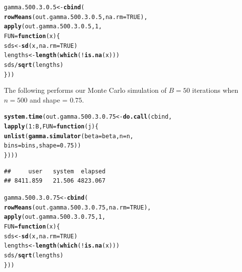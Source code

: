 \documentclass[11pt]{article}\usepackage[]{graphicx}\usepackage[]{color}
\makeatletter
\newcommand{\hlnum}[1]{\textcolor[rgb]{0.686,0.059,0.569}{#1}}%
\newcommand{\hlopt}[1]{\textcolor[rgb]{0,0,0}{#1}}%
\newcommand{\hlstd}[1]{\textcolor[rgb]{0.345,0.345,0.345}{#1}}%
\newcommand{\hlkwa}[1]{\textcolor[rgb]{0.161,0.373,0.58}{\textbf{#1}}}%
\newcommand{\hlkwb}[1]{\textcolor[rgb]{0.69,0.353,0.396}{#1}}%
\newcommand{\hlkwc}[1]{\textcolor[rgb]{0.333,0.667,0.333}{#1}}%
\newcommand{\hlkwd}[1]{\textcolor[rgb]{0.737,0.353,0.396}{\textbf{#1}}}%
\newenvironment{kframe}{%
 \def\at@end@of@kframe{}%
 \ifinner\ifhmode%
  \def\at@end@of@kframe{\end{minipage}}%
  \begin{minipage}{\columnwidth}%
 \fi\fi%
 \def\FrameCommand##1{\hskip\@totalleftmargin \hskip-\fboxsep
 \colorbox{shadecolor}{##1}\hskip-\fboxsep
     \hskip-\linewidth \hskip-\@totalleftmargin \hskip\columnwidth}%
 \MakeFramed {\advance\hsize-\width
   \@totalleftmargin\z@ \linewidth\hsize
   \@setminipage}}%
 {\par\unskip\endMakeFramed%
 \at@end@of@kframe}
\newenvironment{knitrout}{}{} %
\makeatother
\begin{document}
\begin{knitrout}
\color{fgcolor}\begin{kframe}
\begin{alltt}
\hlstd{gamma.500.3.0.5} \hlkwb{<-} \hlkwd{cbind}\hlstd{(}
  \hlkwd{rowMeans}\hlstd{(out.gamma.500.3.0.5,} \hlkwc{na.rm} \hlstd{=} \hlnum{TRUE}\hlstd{),}
  \hlkwd{apply}\hlstd{(out.gamma.500.3.0.5,} \hlnum{1}\hlstd{,}
  \hlkwc{FUN} \hlstd{=} \hlkwa{function}\hlstd{(}\hlkwc{x}\hlstd{)\{}
    \hlstd{sds} \hlkwb{<-} \hlkwd{sd}\hlstd{(x,} \hlkwc{na.rm} \hlstd{=} \hlnum{TRUE}\hlstd{)}
    \hlstd{lengths} \hlkwb{<-} \hlkwd{length}\hlstd{(}\hlkwd{which}\hlstd{(}\hlopt{!}\hlkwd{is.na}\hlstd{(x)))}
    \hlstd{sds} \hlopt{/} \hlkwd{sqrt}\hlstd{(lengths)}
  \hlstd{\}))}
\end{alltt}
\end{kframe}
\end{knitrout}

The following performs our Monte Carlo simulation of $B = 50$ iterations 
when $n = 500$ and shape = $0.75$.

\begin{knitrout}
\color{fgcolor}\begin{kframe}
\begin{alltt}
\hlkwd{system.time}\hlstd{(out.gamma.500.3.0.75} \hlkwb{<-} \hlkwd{do.call}\hlstd{(cbind,}
  \hlkwd{lapply}\hlstd{(}\hlnum{1}\hlopt{:}\hlstd{B,} \hlkwc{FUN} \hlstd{=} \hlkwa{function}\hlstd{(}\hlkwc{j}\hlstd{)\{}
    \hlkwd{unlist}\hlstd{(}\hlkwd{gamma.simulator}\hlstd{(}\hlkwc{beta} \hlstd{= beta,} \hlkwc{n} \hlstd{= n,}
      \hlkwc{bins} \hlstd{= bins,} \hlkwc{shape} \hlstd{=} \hlnum{0.75}\hlstd{))}
\hlstd{\})))}
\end{alltt}
\begin{verbatim}
##     user   system  elapsed 
## 8411.859   21.506 4823.067
\end{verbatim}
\end{kframe}
\end{knitrout}

\begin{knitrout}
\color{fgcolor}\begin{kframe}
\begin{alltt}
\hlstd{gamma.500.3.0.75} \hlkwb{<-} \hlkwd{cbind}\hlstd{(}
  \hlkwd{rowMeans}\hlstd{(out.gamma.500.3.0.75,} \hlkwc{na.rm} \hlstd{=} \hlnum{TRUE}\hlstd{),}
  \hlkwd{apply}\hlstd{(out.gamma.500.3.0.75,} \hlnum{1}\hlstd{,}
  \hlkwc{FUN} \hlstd{=} \hlkwa{function}\hlstd{(}\hlkwc{x}\hlstd{)\{}
    \hlstd{sds} \hlkwb{<-} \hlkwd{sd}\hlstd{(x,} \hlkwc{na.rm} \hlstd{=} \hlnum{TRUE}\hlstd{)}
    \hlstd{lengths} \hlkwb{<-} \hlkwd{length}\hlstd{(}\hlkwd{which}\hlstd{(}\hlopt{!}\hlkwd{is.na}\hlstd{(x)))}
    \hlstd{sds} \hlopt{/} \hlkwd{sqrt}\hlstd{(lengths)}
  \hlstd{\}))}
\end{alltt}
\end{kframe}
\end{knitrout}
\end{document}
